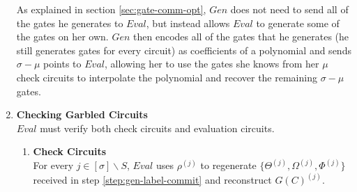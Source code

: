 \documentclass{article}
\begin{document}
\begin{enumerate}
	As explained in section \ref{sec:gate-comm-opt}, $Gen$ does not need to send all of the gates he generates to $Eval$, but instead allows $Eval$ to generate some of the gates on her own. $Gen$ then encodes all of the gates that he generates (he still generates gates for every circuit) as coefficients of a polynomial and sends $\sigma - \mu$ points to $Eval$, allowing her to use the gates she knows from her $\mu$ check circuits to interpolate the polynomial and recover the remaining $\sigma - \mu$ gates. 
	
	\item \label{step:circuit-check} \textbf{Checking Garbled Circuits}\\
	$Eval$ must verify both check circuits and evaluation circuits.
	\begin{enumerate}[label=(\alph*)]
		\item \textbf{Check Circuits}\\
		For every $j \in [\sigma] \backslash S$, $Eval$ uses $\rho^{(j)}$ to regenerate $\{\Theta^{(j)}, \Omega^{(j)}, \Phi^{(j)} \}$ received in step \ref{step:gen-label-commit} and reconstruct $G(C)^{(j)}$.\\
		

\end{enumerate}
\end{enumerate}
\end{document}
